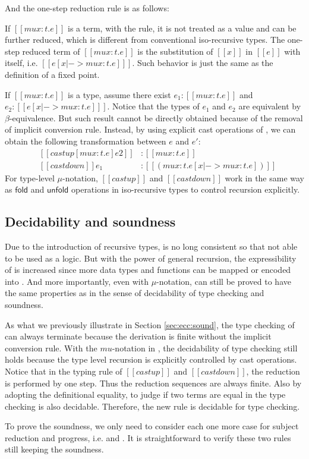 \begin{figure}[ht]
	\ottusedrule{\ottdruleTXXMu{}}
\end{figure}

And the one-step reduction rule is as follows:

\begin{figure}[ht]
	\ottusedrule{\ottdruleSXXMu{}}
\end{figure}

If $[[mu x:t.e]]$ is a term, with the  rule, it is not treated as a value and can be further reduced, which is different from conventional iso-recursive types. The one-step reduced term of $[[mu x:t.e]]$ is the substitution of $[[x]]$ in $[[e]]$ with itself, i.e. $[[e [x |-> mu x:t.e] ]]$. Such behavior is just the same as the definition of a fixed point.

If $[[mu x:t.e]]$ is a type, assume there exist $e_1 : [[mu x:t.e]]$ and $e_2 : [[e [x |-> mu x:t.e] ]]$. Notice that the types of $e_1$ and $e_2$ are equivalent by $\beta$-equivalence. But such result cannot be directly obtained because of the removal of implicit conversion rule. Instead, by using explicit cast operations of \expcc, we can obtain the following transformation between $e$ and $e'$:
\[\begin{array}{lll}
	&[[castup [mu x:t.e] e2]] &: [[mu x:t.e]]\\
	&[[castdown]] e_1 &: [[(mu x:t.e [x |-> mu x:t.e])]]
\end{array}\]
For type-level $\mu$-notation, $[[castup]]$ and $[[castdown]]$ work in the same way as $\textsf{fold}$ and $\textsf{unfold}$ operations in iso-recursive types to control recursion explicitly.

\subsection{Decidability and soundness}

Due to the introduction of recursive types, \name is no long consistent so that not able to be used as a logic. But with the power of general recursion, the expressibility of \name is increased since more data types and functions can be mapped or encoded into \name. And more importantly, even with $\mu$-notation, \name can still be proved to have the same properties as \name in the sense of decidability of type checking and soundness.

As what we previously illustrate in Section \ref{sec:ecc:sound}, the type checking of \expcc can always terminate because the derivation is finite without the implicit conversion rule. With the $mu$-notation in \name, the decidability of type checking still holds because the type level recursion is explicitly controlled by cast operations. Notice that in the typing rule of $[[castup]]$ and $[[castdown]]$, the reduction is performed by one step. Thus the reduction sequences are always finite. Also by adopting the definitional equality, to judge if two terms are equal in the type checking is also decidable. Therefore, the new  rule is decidable for type checking.

To prove the soundness, we only need to consider each one more case for subject reduction and progress, i.e.  and . It is straightforward to verify these two rules still keeping the soundness.
